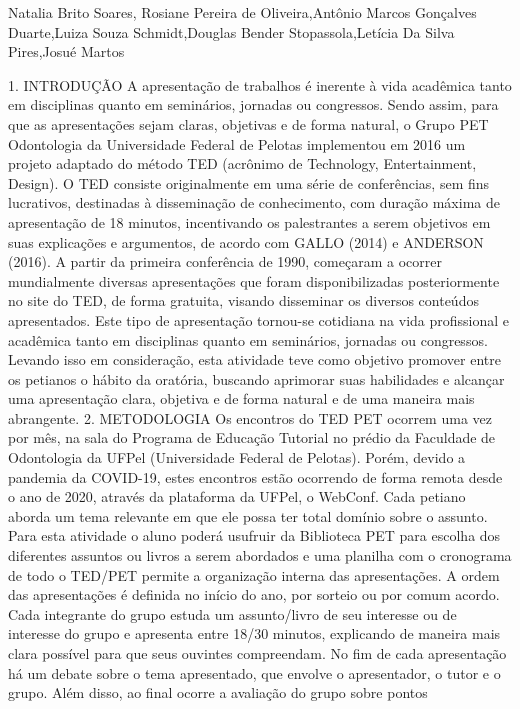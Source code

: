 Natalia Brito Soares, Rosiane Pereira de Oliveira,Antônio Marcos Gonçalves Duarte,Luiza Souza  Schmidt,Douglas Bender Stopassola,Letícia Da Silva Pires,Josué Martos

1. INTRODUÇÃO
A apresentação de trabalhos é inerente à vida acadêmica tanto em disciplinas quanto em
seminários, jornadas ou congressos. Sendo assim, para que as apresentações sejam claras, objetivas
e de forma natural, o Grupo PET Odontologia da Universidade Federal de Pelotas implementou
em 2016 um projeto adaptado do método TED (acrônimo de Technology, Entertainment, Design).
O TED consiste originalmente em uma série de conferências, sem fins lucrativos, destinadas à
disseminação de conhecimento, com duração máxima de apresentação de 18 minutos,
incentivando os palestrantes a serem objetivos em suas explicações e argumentos, de acordo com
GALLO (2014) e ANDERSON (2016).
A partir da primeira conferência de 1990, começaram a ocorrer mundialmente diversas
apresentações que foram disponibilizadas posteriormente no site do TED, de forma gratuita,
visando disseminar os diversos conteúdos apresentados. Este tipo de apresentação tornou-se
cotidiana na vida profissional e acadêmica tanto em disciplinas quanto em seminários, jornadas ou
congressos.
Levando isso em consideração, esta atividade teve como objetivo promover entre os
petianos o hábito da oratória, buscando aprimorar suas habilidades e alcançar uma apresentação
clara, objetiva e de forma natural e de uma maneira mais abrangente.
2. METODOLOGIA
Os encontros do TED PET ocorrem uma vez por mês, na sala do Programa de Educação
Tutorial no prédio da Faculdade de Odontologia da UFPel (Universidade Federal de Pelotas).
Porém, devido a pandemia da COVID-19, estes encontros estão ocorrendo de forma remota desde
o ano de 2020, através da plataforma da UFPel, o WebConf. Cada petiano aborda um tema
relevante em que ele possa ter total domínio sobre o assunto. Para esta atividade o aluno poderá
usufruir da Biblioteca PET para escolha dos diferentes assuntos ou livros a serem abordados e uma
planilha com o cronograma de todo o TED/PET permite a organização interna das apresentações. A ordem das apresentações é definida no início do ano, por sorteio ou por comum acordo.
Cada integrante do grupo estuda um assunto/livro de seu interesse ou de interesse do grupo e
apresenta entre 18/30 minutos, explicando de maneira mais clara possível para que seus ouvintes
compreendam. No fim de cada apresentação há um debate sobre o tema apresentado, que envolve
o apresentador, o tutor e o grupo. Além disso, ao final ocorre a avaliação do grupo sobre pontos
